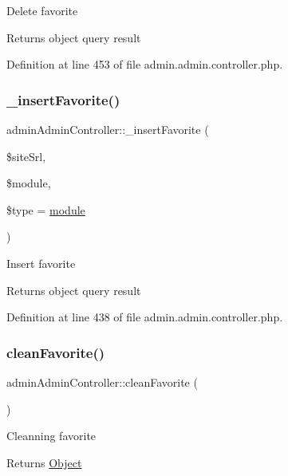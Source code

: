 Delete favorite \begin{DoxyReturn}{Returns}
object query result 
\end{DoxyReturn}


Definition at line 453 of file admin.\+admin.\+controller.\+php.

\mbox{\label{classadminAdminController_ac8d650e27693beb7fc6814eb5e982f28}} 
\subsubsection{\texorpdfstring{\+\_\+insert\+Favorite()}{\_insertFavorite()}}
{\footnotesize\ttfamily admin\+Admin\+Controller\+::\+\_\+insert\+Favorite (\begin{DoxyParamCaption}\item[{}]{\$site\+Srl,  }\item[{}]{\$module,  }\item[{}]{\$type = {\ttfamily \textquotesingle{}\hyperlink{classmodule}{module}\textquotesingle{}} }\end{DoxyParamCaption})}

Insert favorite \begin{DoxyReturn}{Returns}
object query result 
\end{DoxyReturn}


Definition at line 438 of file admin.\+admin.\+controller.\+php.

\mbox{\label{classadminAdminController_a774b7d9260572f5d6391adc624e6b810}} 
\subsubsection{\texorpdfstring{clean\+Favorite()}{cleanFavorite()}}
{\footnotesize\ttfamily admin\+Admin\+Controller\+::clean\+Favorite (\begin{DoxyParamCaption}{ }\end{DoxyParamCaption})}

Cleanning favorite \begin{DoxyReturn}{Returns}
\hyperlink{classObject}{Object} 
\end{DoxyReturn}


